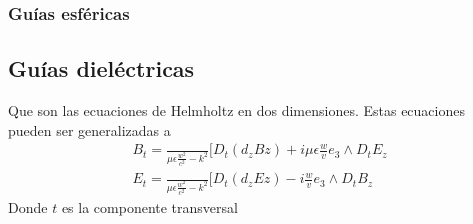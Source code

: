 \subsubsection{Guías esféricas}

\subsection{Guías dieléctricas}
Que son las ecuaciones de Helmholtz en dos dimensiones. Estas ecuaciones pueden ser generalizadas a
\begin{subequations}
	\begin{align}
	B_{t}=\frac{}{\mu \epsilon\frac{w^2}{c^2}-k^2}[D_{t} (d_{z} B{z})+i\mu\epsilon\frac{w}{v}e_{3}\wedge D_{t}E_{z} \\
	E_{t}=\frac{}{\mu \epsilon\frac{w^2}{c^2}-k^2}[D_{t} (d_{z} E{z})-i\frac{w}{v}e_{3}\wedge D_{t}B_{z} 
	\end{align}
	\end{subequations}
Donde $t$ es la componente transversal